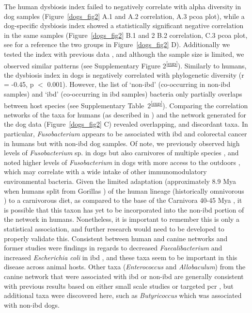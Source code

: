 The human dysbiosis index failed to negatively correlate with alpha diversity 
in dog samples (Figure~\ref{dogs_fig2} A.1 and A.2 correlation, A.3 \gls{pcoa} 
plot), while a dog-specific dysbiosis index showed a statistically significant 
negative correlation in the same samples (Figure~\ref{dogs_fig2} B.1 and 2 B.2 
correlation, C.3 \gls{pcoa} plot, see for a reference the two groups in 
Figure~\ref{dogs_fig2} D). Additionally we tested the index with previous data 
\cite{RN153}, and although the sample size is limited, we observed similar 
patterns (see Supplementary Figure 2\textsuperscript{\ref{sup}}). Similarly to 
humans, the dysbiosis index in dogs is negatively correlated with phylogenetic 
diversity (r = -0.45, p $<$ 0.001). However, the list of `non-\gls{ibd}' 
(co-occurring in non-\gls{ibd} samples) and `\gls{ibd}' (co-occurring in 
\gls{ibd} samples) bacteria only partially overlaps between host species (see 
Supplementary Table~2\textsuperscript{\ref{sup}}). Comparing the correlation 
networks of the taxa for humans (as described in \cite{RN154}) and the network 
generated for the dog data (Figure~\ref{dogs_fig2} C) revealed overlapping, and 
discordant taxa. In particular, \textit{Fusobacterium} appears to be associated 
with \gls{ibd} \cite{RN154} and colorectal cancer \cite{RN3983} in humans but 
with non-\gls{ibd} dog samples. Of note, we previously observed high levels of 
\textit{Fusobacterium} sp. in dogs \cite{RN150} but also carnivores of multiple 
species \cite{RN8250, RN114}, and noted higher levels of \textit{Fusobacterium} 
in dogs with more access to the outdoors \cite{RN4082}, which may correlate 
with a wide intake of other immunomodulatory environmental bacteria. Given the 
limited adaptation (approximately 8.9 Mya when humans split from Gorillas 
\cite{RN3988}) of the human lineage (historically omnivorous \cite{RN3987}) to 
a carnivorous diet, as compared to the base of the Carnivora 40-45 Mya 
\cite{RN3989}, it is possible that this taxon has yet to be incorporated into 
the non-\gls{ibd} portion of the network in humans. Nonetheless, it is 
important to remember this is only a statistical association, and further 
research would need to be developed to properly validate this. Consistent 
between human and canine networks and former studies were findings in regards 
to decreased \textit{Faecalibacterium} and increased \textit{Escherichia coli} 
in \gls{ibd} \cite{RN17138}, and these taxa seem to be important in this 
disease across animal hosts. Other taxa (\textit{Enterococcus} and 
\textit{Allobaculum}) from the canine network that were associated with 
\gls{ibd} or non-\gls{ibd} are generally consistent with previous results based 
on either small scale studies or targeted \gls{pcr} \cite{RN153}, but 
additional taxa were discovered here, such as \textit{Butyricoccus} which was 
associated with non-\gls{ibd} dogs.

